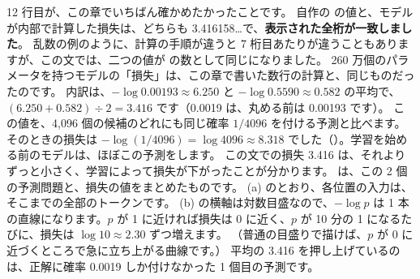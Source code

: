 12 行目が、この章でいちばん確かめたかったことです。
自作の  の値と、モデルが内部で計算した損失は、どちらも 3.416158\dots で、\textbf{表示された全桁が一致しました}。
乱数の例のように、計算の手順が違うと 7 桁目あたりが違うこともありますが、この文では、二つの値が  の数として同じになりました。
260 万個のパラメータを持つモデルの「損失」は、この章で書いた数行の計算と、同じものだったのです。
内訳は、$-\log 0.00193\approx 6.250$ と $-\log 0.5590\approx 0.582$ の平均で、$(6.250+0.582)\div 2=3.416$ です（0.0019 は、丸める前は 0.00193 です）。
この値を、4,096 個の候補のどれにも同じ確率 $1/4096$ を付ける予測と比べます。
そのときの損失は $-\log(1/4096)=\log 4096\approx 8.318$ でした（）。学習を始める前のモデルは、ほぼこの予測をします。
この文での損失 3.416 は、それよりずっと小さく、学習によって損失が下がったことが分かります。
は、この 2 個の予測問題と、損失の値をまとめたものです。
(a) のとおり、各位置の入力は、そこまでの全部のトークンです。
(b) の横軸は対数目盛なので、$-\log p$ は 1 本の直線になります。$p$ が 1 に近ければ損失は 0 に近く、$p$ が 10 分の 1 になるたびに、損失は $\log 10\approx 2.30$ ずつ増えます。
（普通の目盛りで描けば、$p$ が 0 に近づくところで急に立ち上がる曲線です。）
平均の 3.416 を押し上げているのは、正解に確率 0.0019 しか付けなかった 1 個目の予測です。

